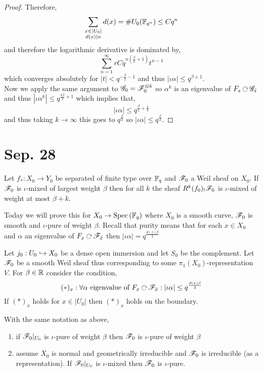 \documentclass[12pt]{article}
\begin{document}
\begin{proof}
Therefore,
\[ \sum_{\substack{x \in |U_0| \\ d(x) \mid n}} d(x) = \# U_0(\mathbb{F}_{q^n}) \le C q^n \]
and therefore the logarithmic derivative is dominated by,
\[ \sum_{n = 1}^\infty r C q^{n \left( \frac{\beta}{2} + 1 \right)} t^{n-1} \]
which converges absolutely for $|t| < q^{- \frac{\beta}{2} - 1}$ and thus $|\iota \alpha| \le q^{\beta + 1}$. 
\bigskip\\
Now we apply the same argument to $\mathscr{G}_0 = \mathscr{F}_0^{\otimes k}$ so $\alpha^k$ is an eigenvalue of $F_s \acts \G_{\bar{s}}$ and thus $| \iota \alpha^k | \le q^{\frac{k \beta}{2} + 1}$ which implies that,
\[ | \iota \alpha | \le q^{\frac{\beta}{2} + \frac{1}{k}} \]
and thus taking $k \to \infty$ this goes to $q^{\frac{\beta}{2}}$ so $| \iota \alpha| \le q^{\frac{\beta}{2}}$. 
\end{proof}

\section{Sep. 28}

\begin{thm}
Let $f_* : X_0 \to Y_0$ be separated of finite type over $\mathbb{F}_q$ and $\mathscr{F}_0$ a Weil sheaf on $X_0$. If $\mathscr{F}_0$ is $\iota$-mixed of largest weight $\beta$ then for all $k$ the sheaf $R^k (f_0)_! \mathscr{F}_0$ is $\iota$-mixed of weight at most $\beta + k$.
\end{thm}

\begin{rmk}
Today we will prove this for $X_0 \to \mathrm{Spec}\left( \mathbb{F}_q \right)$ where $X_0$ is a smooth curve, $\mathscr{F}_0$ is smooth and $\iota$-pure of weight $\beta$. Recall that purity means that for each $x \in X_0$ and $\alpha$ an eigenvalue of $F_x \acts \F_{\bar{x}}$ then $|\iota \alpha| = q^{\frac{d(x) \beta}{2}}$
\end{rmk}

\begin{thm}[Semicontinuity]
Let $j_0 : U_0 \hookrightarrow X_0$ be a dense open immersion and let $S_0$ be the complement. Let $\mathscr{F}_0$ be a smooth Weil sheaf thus corresponding to some $\pi_1(X_0)$-representation $V$. For $\beta \in \mathbb{R}$ consider the condition,
\[ (*)_x : \forall \alpha \text{ eigenvalue of } F_x \acts \F_{\bar{x}} : |\iota \alpha| \le q^{\frac{d(x) \beta}{2}} \]
If $(*)_x$ holds for $x \in |U_0|$ then $(*)_x$ holds on the boundary.
\end{thm}

\begin{cor}
With the same notation as above,
\begin{enumerate}
\item if $\mathscr{F}_0 |_{U_0}$ is $\iota$-pure of weight $\beta$ then $\mathscr{F}_0$ is $\iota$-pure of weight $\beta$
\item assume $X_0$ is normal and geometrically irreducible and $\mathscr{F}_0$ is irreducible (as a representation). If $\mathscr{F}_0 |_{U_0}$ is $\iota$-mixed then $\mathscr{F}_0$ is $\iota$-pure.
\end{enumerate}
\end{cor}
\end{document}
